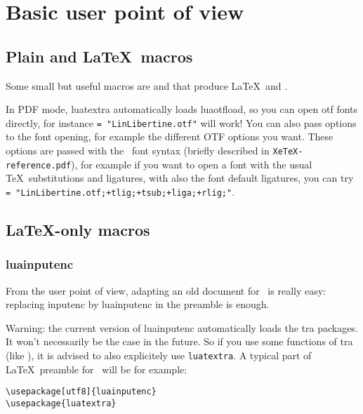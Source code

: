 \documentclass{article}
\makeatletter
\newlength\xxt@kern@Te
\newlength\xxt@kern@eX
\newlength\xxt@lower@e
\DeclareRobustCommand\XeTeX{%
  \leavevmode
  \smash{%
   X\lower\xxt@lower@e
   \hbox{\kern\xxt@kern@eX
   \setbox0=\hbox{E}\dimen0=\ht0\advance\dimen0by\dp0%
   \raise\dimen0\hbox{\rotatebox{180}{\box0}}%
   }\kern\xxt@kern@Te\TeX}}%
\makeatother
\begin{document}
\section{Basic user point of view}

\subsection{Plain and \LaTeX\ macros}

Some small but useful macros are \texttt{\string\LuaTeX} and \texttt{\string\LuaLaTeX} that produce \LaTeX\ and \LuaLaTeX .

In PDF mode, \textsf{luatextra} automatically loads \textsf{luaotfload}, so you can open otf fonts directly, for instance \texttt{\string\font\string\foo = "LinLibertine.otf"\string\foo} will work! You can also pass options to the font opening, for example the different OTF options you want. These options are passed with the \XeTeX\ font syntax (briefly described in \texttt{XeTeX-reference.pdf}), for example if you want to open a font with the usual \TeX\ substitutions and ligatures, with also the font default ligatures, you can try \newline \texttt{\string\font\string\foo = "LinLibertine.otf;+tlig;+tsub;+liga;+rlig;"\string\foo}.

\subsection{\LaTeX -only macros}

\subsubsection{luainputenc}

From the user point of view, adapting an old document for \LuaTeX\ is really easy: replacing \textsf{inputenc} by \textsf{luainputenc} in the preamble is enough.

\textsf{Warning:} the current version of \textsf{luainputenc} automatically loads the \LuaTeX tra packages. It won't necessarily be the case in the future. So if you use some functions of \LuaTeX tra (like \texttt{\string\newluaattribute}), it is advised to also explicitely use \texttt{luatextra}. A typical part of \LaTeX\ preamble for \LuaTeX\ will be for example:

\begin{verbatim}
\usepackage[utf8]{luainputenc}
\usepackage{luatextra}
\end{verbatim}
\end{document}
